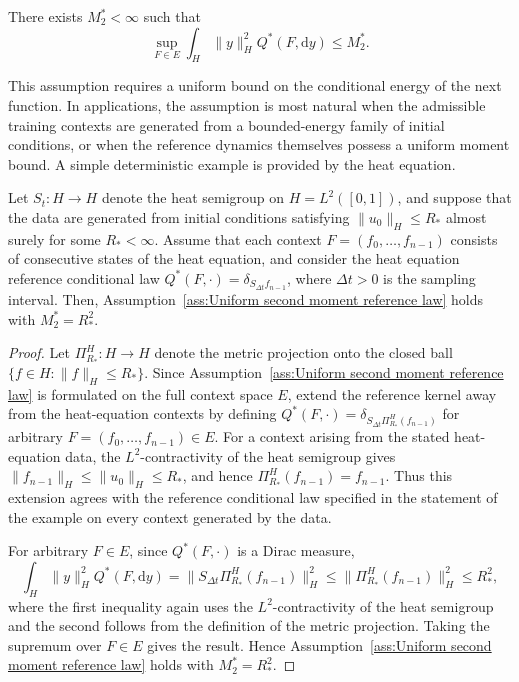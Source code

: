 \begin{assumption}
\label{ass:Uniform second moment reference law}
There exists \(M_2^*<\infty\) such that
\[
\sup_{F\in E}
\int_H
\|y\|_H^2
Q^*(F,\mathrm dy)
\leqslant
M_2^*.
\]
\end{assumption}

This assumption requires a uniform bound on the conditional energy of the next function. In applications, the assumption is most natural when the admissible training contexts are generated from a bounded-energy family of initial conditions, or when the reference dynamics themselves possess a uniform moment bound. A simple deterministic example is provided by the heat equation.

\begin{example}
\label{ex:Heat equation uniform second moment}
Let \(S_t:H\to H\) denote the heat semigroup on \(H=L^2([0,1])\), and suppose that the data are generated from initial conditions satisfying \(\|u_0\|_H\leqslant R_*\) almost surely for some \(R_*<\infty\). Assume that each context \(F=(f_0,\ldots,f_{n-1})\) consists of consecutive states of the heat equation, and consider the heat equation reference conditional law \(Q^*(F,\cdot)=\delta_{S_{\Delta t}f_{n-1}}\), where \(\Delta t>0\) is the sampling interval. Then, Assumption~\ref{ass:Uniform second moment reference law} holds with \(M_2^*=R_*^2\).
\end{example}

\begin{proof}
Let \(\Pi_{R_*}^H:H\to H\) denote the metric projection onto the closed ball \(\{f\in H:\|f\|_H\leqslant R_*\}\). Since Assumption~\ref{ass:Uniform second moment reference law} is formulated on the full context space \(E\), extend the reference kernel away from the heat-equation contexts by defining \(Q^*(F,\cdot)=\delta_{S_{\Delta t}\Pi_{R_*}^H(f_{n-1})}\) for arbitrary \(F=(f_0,\ldots,f_{n-1})\in E\). For a context arising from the stated heat-equation data, the \(L^2\)-contractivity of the heat semigroup gives \(\|f_{n-1}\|_H\leqslant\|u_0\|_H\leqslant R_*\), and hence \(\Pi_{R_*}^H(f_{n-1})=f_{n-1}\). Thus this extension agrees with the reference conditional law specified in the statement of the example on every context generated by the data.

For arbitrary \(F\in E\), since \(Q^*(F,\cdot)\) is a Dirac measure,
\[\int_H\|y\|_H^2Q^*(F,\mathrm dy)=\|S_{\Delta t}\Pi_{R_*}^H(f_{n-1})\|_H^2\leqslant\|\Pi_{R_*}^H(f_{n-1})\|_H^2\leqslant R_*^2,\]
where the first inequality again uses the \(L^2\)-contractivity of the heat semigroup and the second follows from the definition of the metric projection. Taking the supremum over \(F\in E\) gives the result. Hence Assumption~\ref{ass:Uniform second moment reference law} holds with \(M_2^*=R_*^2\).
\end{proof}

